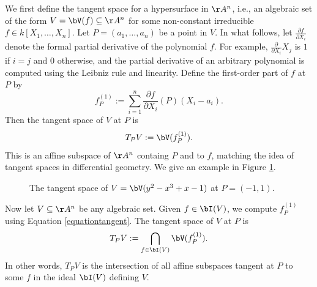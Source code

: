 \documentclass[12pt]{amsart}
\theoremstyle{plain}
\theoremstyle{definition}
\begin{document}
We first define the tangent space for a hypersurface in $\AA^n$, i.e., an algebraic set of the form $V=\bV(f)\subseteq \AA^n$ for some non-constant irreducible $f \in k[X_1,\ldots,X_n]$.
Let $P=(a_1,\ldots,a_n)$ be a point in $V$.
In what follows, let $\frac{\partial f}{\partial X_i}$ denote the formal partial derivative of the polynomial $f$.
For example, $\frac{\partial}{\partial X_i} X_j$ is $1$ if $i=j$ and $0$ otherwise, and the partial derivative of an arbitrary polynomial is computed using the Leibniz rule and linearity.
Define the first-order part of $f$ at $P$ by
\begin{equation}\label{equationtangent}
f_P^{(1)} := \sum_{i=1}^n \frac{\partial f}{\partial X_i} (P) (X_i-a_i).
\end{equation}
Then the tangent space of $V$ at $P$ is
$$T_PV := \bV(f_P^{(1)}).$$
This is an affine subspace of $\AA^n$ containg $P$ and to $f$, matching the idea of tangent spaces in differential geometry.
We give an example in Figure \ref{figure:tangentspace}.

\begin{figure}[h]
\centering
{}
\caption{The tangent space of $V = \bV(y^2 - x^3 + x - 1)$ at $P=(-1, 1)$.}
\label{figure:tangentspace}
\end{figure}

Now let $V\subseteq\AA^n$ be any algebraic set.
Given $f\in\bI(V)$, we compute $f_P^{(1)}$ using Equation \ref{equationtangent}.
The tangent space of $V$ at $P$ is
$$T_PV := \bigcap_{f\in\bI(V)} \bV(f_P^{(1)}).$$
In other words, $T_PV$ is the intersection of all affine subspaces tangent at $P$ to some $f$ in the ideal $\bI(V)$ defining $V$.
\end{document}
